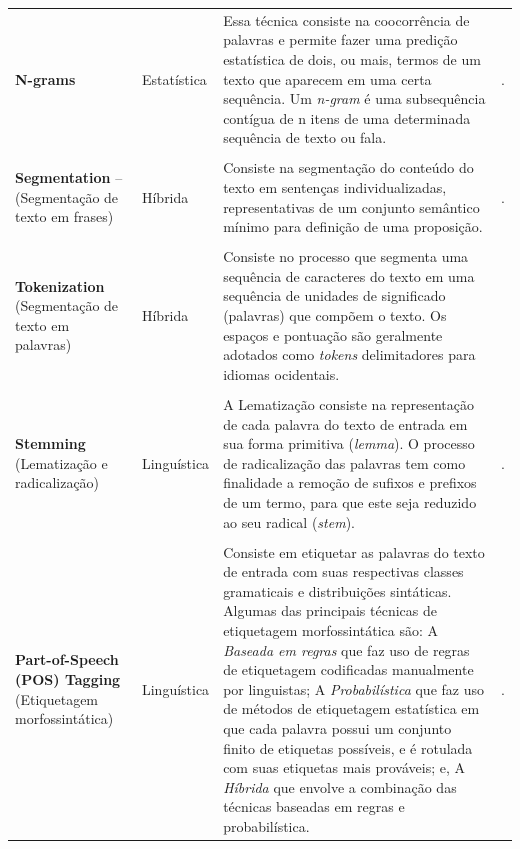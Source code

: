 \documentclass[portuguese]{textolivre}
\begin{document}
\begin{longtable}{p{3cm}p{2cm}p{7cm}p{3.5cm}}
{\footnotesize \textbf{N-grams}} & {\footnotesize Estatística} & {\footnotesize Essa técnica consiste na coocorrência de palavras e permite fazer uma predição estatística de dois, ou mais, termos de um texto que aparecem em uma certa sequência. Um \textit{n-gram} é uma subsequência contígua de n itens de uma determinada sequência de texto ou fala.} & {\footnotesize \textcite{cohen_highlights:_1995,liu_extractive_2009,alencar_aelius:_2010,alencar_aelius_2013a,tonelli_matching_2011}.}\\
\\

{\footnotesize \textbf{Segmentation} -- (Segmentação de texto em frases)} & {\footnotesize Híbrida} & {\footnotesize Consiste na segmentação do conteúdo do texto em sentenças individualizadas, representativas de um conjunto semântico mínimo para definição de uma proposição.} & {\footnotesize \textcite{lin_discovering_2009,sousa_e-dictor:_2010,alencar_aelius_2013b}.}\\
\\ 
{\footnotesize \textbf{Tokenization} (Segmentação de texto em palavras)} & {\footnotesize Híbrida} & {\footnotesize Consiste no processo que segmenta uma sequência de caracteres do texto em uma sequência de unidades de significado (palavras) que compõem o texto. Os espaços e pontuação são geralmente adotados como \textit{tokens} delimitadores para idiomas ocidentais.} & {\footnotesize \textcite{webster_tokenization_1992,sousa_e-dictor:_2010,alencar_aelius_2013b,silva_mineracao_2015}}\\
\\
{\footnotesize \textbf{Stemming} (Lematização e radicalização)} & {\footnotesize Linguística} & {\footnotesize A Lematização consiste na representação de cada palavra do texto de entrada em sua forma primitiva (\textit{lemma}). O processo de radicalização das palavras tem como finalidade a remoção de sufixos e prefixos de um termo, para que este seja reduzido ao seu radical (\textit{stem}).} & {\footnotesize \textcite{lovins_development_1968,sousa_e-dictor:_2010,rolim_identificacao_2016}.} \\
\\ 
{\footnotesize \textbf{Part-of-Speech (POS) Tagging} (Etiquetagem morfossintática)} & {\footnotesize Linguística} & {\footnotesize Consiste em etiquetar as palavras do texto de entrada com suas respectivas classes gramaticais e distribuições sintáticas. Algumas das principais técnicas de etiquetagem morfossintática são: A \textit{Baseada em regras} que faz uso de regras de etiquetagem codificadas manualmente por linguistas; A \textit{Probabilística} que faz uso de métodos de etiquetagem estatística em que cada palavra possui um conjunto finito de etiquetas possíveis, e é rotulada com suas etiquetas mais prováveis; e, A \textit{Híbrida} que envolve a combinação das técnicas baseadas em regras e probabilística.} & {\footnotesize \textcite{lau_towards_2008,domingues_o_2008,sousa_e-dictor:_2010,alencar_aelius_2013b,santos_learning_2014}.}\\

\end{longtable}
\end{document}
